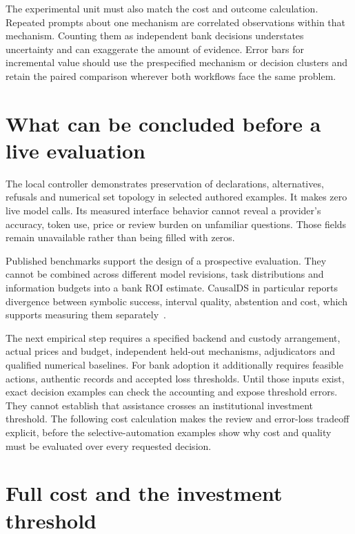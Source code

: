 The experimental unit must also match the cost and outcome calculation.
Repeated prompts about one mechanism are correlated observations within that
mechanism. Counting them as independent bank decisions understates uncertainty
and can exaggerate the amount of evidence. Error bars for incremental value
should use the prespecified mechanism or decision clusters and retain the
paired comparison wherever both workflows face the same problem.

\section{What can be concluded before a live evaluation}

The local controller demonstrates preservation of declarations, alternatives,
refusals and numerical set topology in selected authored examples. It makes
zero live model calls. Its measured interface behavior cannot reveal a
provider's accuracy, token use, price or review burden on unfamiliar questions.
Those fields remain unavailable rather than being filled with zeros.

Published benchmarks support the design of a prospective evaluation. They
cannot be combined across different model revisions, task distributions and
information budgets into a bank ROI estimate. CausalDS in particular reports
divergence between symbolic success, interval quality, abstention and cost,
which supports measuring them separately~\citep{v12_la_2607_08093}.

The next empirical step requires a specified backend and custody arrangement,
actual prices and budget, independent held-out mechanisms, adjudicators and
qualified numerical baselines. For bank adoption it additionally requires
feasible actions, authentic records and accepted loss thresholds. Until those
inputs exist, exact decision examples can check the accounting and expose
threshold errors. They cannot establish that assistance crosses an institutional
investment threshold. The following cost calculation makes the review and error-loss tradeoff explicit, before the selective-automation examples show why cost and quality must be evaluated over every requested decision.


\hypertarget{full-cost-and-the-investment-threshold}{%
\section{Full cost and the investment
threshold}\label{full-cost-and-the-investment-threshold}}


